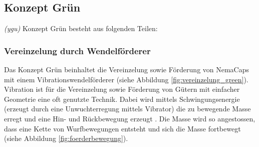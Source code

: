 \newpage
\subsection{Konzept Grün}
\label{KonzeptGreen}
\textit{(ygu)} Konzept Grün besteht aus folgenden Teilen:

\subsubsection{Vereinzelung durch Wendelförderer}

Das Konzept Grün beinhaltet die Vereinzelung sowie Förderung von NemaCaps mit einem Vibrationswendelförderer (siehe Abbildung \ref{fig:vereinzelung_green}).
Vibration ist für die Vereinzelung sowie Förderung von Gütern mit einfacher Geometrie eine oft genutzte Technik. Dabei wird mittels Schwingungsenergie (erzeugt durch eine Unwuchterregung mittels Vibrator) die zu bewegende Masse erregt und eine Hin- und Rückbewegung erzeugt \cite{risch}. Die Masse wird so angestossen, dass eine Kette von Wurfbewegungen entsteht und sich die Masse fortbewegt (siehe Abbildung \ref{fig:foerderbewegung}).



